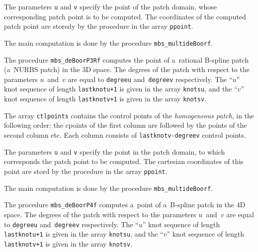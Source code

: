 The parameters \texttt{u} and \texttt{v} specify the point of the patch domain,
whose corresponding patch point is to be computed. The coordinates of the
computed patch point are storedy by the procedure in the array
\texttt{ppoint}.

The main computation is done by the procedure \texttt{mbs\_multideBoorf}.

\vspace{\bigskipamount}
\begin{sloppypar}
The procedure \texttt{mbs\_deBoorP3Rf} computes the point of a~rational
B-spline patch (a~NURBS patch) in the $3$D space. The degrees of the patch
with respect to the parameters $u$~and~$v$ are equal to \texttt{degreeu}
and~\texttt{degreev} respectively. The ``$u$'' knot sequence of length
\texttt{lastknotu+1} is given in the array \texttt{knotsu}, and the ``$v$''
knot sequence of length \texttt{lastknotv+1} is given in the array
\texttt{knotsv}.
\end{sloppypar}

The array \texttt{ctlpoints} contains the control points of the
\emph{homogeneous patch}, in the following order: the cpoints of the first column
are followed by the points of the second column etc.
Each column consists of \texttt{lastknotv-degreev} control points.

The parameters \texttt{u} and \texttt{v} specify the point in the patch domain,
to which corresponds the patch point to be computed. The cartesian coordinates
of this point are stord by the procedure in the array \texttt{ppoint}.

The main computation is done by the procedure \texttt{mbs\_multideBoorf}.

\vspace{\bigskipamount}
The procedure \texttt{mbs\_deBoorP4f} computes a~point of a~B-spline patch
in the $4$D space. The degrees of the patch with respect to the parameters
$u$~and~$v$ are equal to \texttt{degreeu} and~\texttt{degreev} respectively.
The ``$u$'' knot sequence of length \texttt{lastknotu+1} is given in the array
\texttt{knotsu}, and the ``$v$'' knot sequence of length \texttt{lastknotv+1}
is given in the array \texttt{knotsv}.

